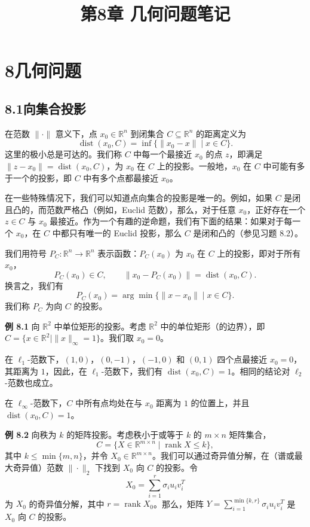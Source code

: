 \documentclass[UTF8,12pt,a4paper,fontset=fandol]{ctexart}
\title{第8章 几何问题笔记}
\author{}
\date{}
\begin{document}
\maketitle

\section*{8\quad 几何问题}

\subsection*{8.1\quad 向集合投影}

在范数 $\|\cdot\|$ 意义下，点 $x_0\in\mathbb{R}^n$ 到闭集合 $C\subseteq\mathbb{R}^n$ 的距离定义为
\[
\operatorname{dist}(x_0,C)=\inf\{\|x_0-x\|\mid x\in C\}.
\]
这里的极小总是可达的。我们称 $C$ 中每一个最接近 $x_0$ 的点 $z$，即满足 $\|z-x_0\|=\operatorname{dist}(x_0,C)$，为 $x_0$ 在 $C$ 上的投影。一般地，$x_0$ 在 $C$ 中可能有多于一个的投影，即 $C$ 中有多个点都最接近 $x_0$。

在一些特殊情况下，我们可以知道点向集合的投影是唯一的。例如，如果 $C$ 是闭且凸的，而范数严格凸（例如，Euclid 范数），那么，对于任意 $x_0$，正好存在一个 $z\in C$ 与 $x_0$ 最接近。作为一个有趣的逆命题，我们有下面的结果：如果对于每一个 $x_0$，在 $C$ 中都只有唯一的 Euclid 投影，那么 $C$ 是闭和凸的（参见习题 8.2）。

我们用符号 $P_C:\mathbb{R}^n\to\mathbb{R}^n$ 表示函数：$P_C(x_0)$ 为 $x_0$ 在 $C$ 上的投影，即对于所有 $x_0$，
\[
P_C(x_0)\in C,\qquad \|x_0-P_C(x_0)\|=\operatorname{dist}(x_0,C).
\]
换言之，我们有
\[
P_C(x_0)=\arg\min\{\|x-x_0\|\mid x\in C\}.
\]
我们称 $P_C$ 为向 $C$ 的投影。

\noindent\textbf{例 8.1}\quad
向 $\mathbb{R}^2$ 中单位矩形的投影。考虑 $\mathbb{R}^2$ 中的单位矩形（的边界），即 $C=\{x\in\mathbb{R}^2\mid \|x\|_\infty=1\}$。我们取 $x_0=0$。

在 $\ell_1$-范数下，$(1,0)$，$(0,-1)$，$(-1,0)$ 和 $(0,1)$ 四个点最接近 $x_0=0$，其距离为 $1$，因此，在 $\ell_1$-范数下，我们有 $\operatorname{dist}(x_0,C)=1$。相同的结论对 $\ell_2$-范数也成立。

在 $\ell_\infty$-范数下，$C$ 中所有点均处在与 $x_0$ 距离为 $1$ 的位置上，并且 $\operatorname{dist}(x_0,C)=1$。

\noindent\textbf{例 8.2}\quad
向秩为 $k$ 的矩阵投影。考虑秩小于或等于 $k$ 的 $m\times n$ 矩阵集合，
\[
C=\{X\in\mathbb{R}^{m\times n}\mid \operatorname{rank}X\leq k\},
\]
其中 $k\leq \min\{m,n\}$，并令 $X_0\in\mathbb{R}^{m\times n}$。我们可以通过奇异值分解，在（谱或最大奇异值）范数 $\|\cdot\|_2$ 下找到 $X_0$ 向 $C$ 的投影。令
\[
X_0=\sum_{i=1}^r\sigma_i u_i v_i^T
\]
为 $X_0$ 的奇异值分解，其中 $r=\operatorname{rank}X_0$。那么，矩阵 $Y=\sum_{i=1}^{\min\{k,r\}}\sigma_i u_i v_i^T$ 是 $X_0$ 向 $C$ 的投影。
\end{document}

